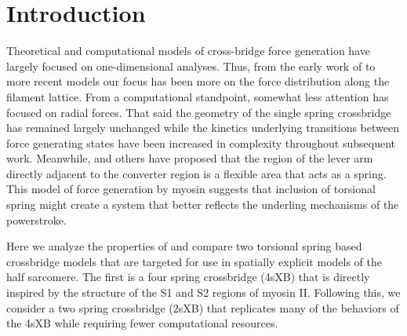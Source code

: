 \documentclass[]{article}
\begin{document}
\section{Introduction} %



Theoretical and computational models of cross-bridge force generation have largely focused on one-dimensional analyses. 
Thus, from the early work of \citet{Huxley:1957:p255} to more recent models \citep{Daniel:1998:p1611, Chase:2004:p204, Tanner:2007:pe115} our focus has been more on the force distribution along the filament lattice.  
From a computational standpoint, somewhat less attention has focused on radial forces. 
That said the geometry of the single spring crossbridge has remained largely unchanged while the kinetics underlying transitions between force generating states have been increased in complexity throughout subsequent work. \citep{Pate:1989:p181, Daniel:1998:p1611, Tanner:2007:pe115}
Meanwhile, \citet{Houdusse:2001:p182} and others have proposed that the region of the lever arm directly adjacent to the converter region is a flexible area that acts as a spring. 
This model of force generation by myosin suggests that inclusion of torsional spring might create a system that better reflects the underling mechanisms of the powerstroke. 

Here we analyze the properties of and compare two torsional spring based crossbridge models that are targeted for use in spatially explicit models of the half sarcomere. 
The first is a four spring crossbridge (4sXB) that is directly inspired by the structure of the S1 and S2 regions of myosin II. 
Following this, we consider a two spring crossbridge (2sXB) that replicates many of the behaviors of the 4sXB while requiring fewer computational resources.
\end{document}
